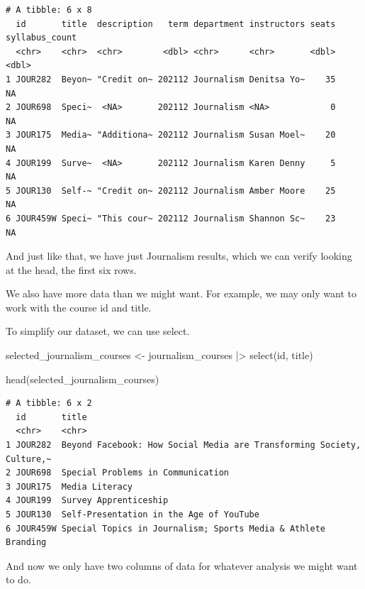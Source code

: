 \documentclass[
  letterpaper,
  DIV=11,
  numbers=noendperiod]{scrreprt}
\newenvironment{Shaded}{\begin{snugshade}}{\end{snugshade}}
\newcommand{\FunctionTok}[1]{\textcolor[rgb]{0.28,0.35,0.67}{#1}}
\newcommand{\NormalTok}[1]{\textcolor[rgb]{0.00,0.23,0.31}{#1}}
\newcommand{\OtherTok}[1]{\textcolor[rgb]{0.00,0.23,0.31}{#1}}
\newcommand{\SpecialCharTok}[1]{\textcolor[rgb]{0.37,0.37,0.37}{#1}}
\begin{document}
\begin{verbatim}
# A tibble: 6 x 8
  id       title  description   term department instructors seats syllabus_count
  <chr>    <chr>  <chr>        <dbl> <chr>      <chr>       <dbl>          <dbl>
1 JOUR282  Beyon~ "Credit on~ 202112 Journalism Denitsa Yo~    35             NA
2 JOUR698  Speci~  <NA>       202112 Journalism <NA>            0             NA
3 JOUR175  Media~ "Additiona~ 202112 Journalism Susan Moel~    20             NA
4 JOUR199  Surve~  <NA>       202112 Journalism Karen Denny     5             NA
5 JOUR130  Self-~ "Credit on~ 202112 Journalism Amber Moore    25             NA
6 JOUR459W Speci~ "This cour~ 202112 Journalism Shannon Sc~    23             NA
\end{verbatim}

And just like that, we have just Journalism results, which we can verify
looking at the head, the first six rows.

We also have more data than we might want. For example, we may only want
to work with the course id and title.

To simplify our dataset, we can use select.

\begin{Shaded}
\begin{Highlighting}[]
\NormalTok{selected\_journalism\_courses }\OtherTok{\textless{}{-}}\NormalTok{ journalism\_courses }\SpecialCharTok{|\textgreater{}} \FunctionTok{select}\NormalTok{(id, title)}

\FunctionTok{head}\NormalTok{(selected\_journalism\_courses)}
\end{Highlighting}
\end{Shaded}

\begin{verbatim}
# A tibble: 6 x 2
  id       title                                                                
  <chr>    <chr>                                                                
1 JOUR282  Beyond Facebook: How Social Media are Transforming Society, Culture,~
2 JOUR698  Special Problems in Communication                                    
3 JOUR175  Media Literacy                                                       
4 JOUR199  Survey Apprenticeship                                                
5 JOUR130  Self-Presentation in the Age of YouTube                              
6 JOUR459W Special Topics in Journalism; Sports Media & Athlete Branding        
\end{verbatim}

And now we only have two columns of data for whatever analysis we might
want to do.
\end{document}
